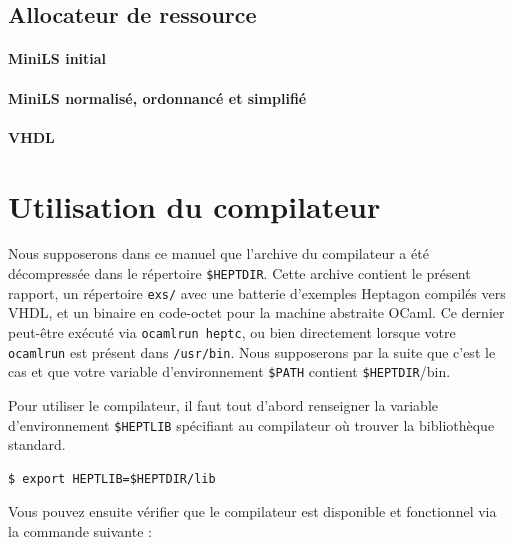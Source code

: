 \documentclass[a4paper]{article}
\newcommand{\LANG}{Heptagon}
\begin{document}
\subsection{Allocateur de ressource}

\paragraph{MiniLS initial}

\small

\normalsize

\paragraph{MiniLS normalis\'e, ordonnanc\'e et simplifi\'e}

\small

\normalsize

\paragraph{VHDL}

\small

\normalsize

\section{Utilisation du compilateur}

Nous supposerons dans ce manuel que l'archive du compilateur a \'et\'e
d\'ecompress\'ee dans le r\'epertoire \verb/$HEPTDIR/. Cette archive contient le
pr\'esent rapport, un r\'epertoire \texttt{exs/} avec une batterie d'exemples
\LANG{} compil\'es vers VHDL, et un binaire en code-octet pour la machine
abstraite OCaml. Ce dernier peut-\^etre ex\'ecut\'e via \texttt{ocamlrun heptc},
ou bien directement lorsque votre \texttt{ocamlrun} est pr\'esent dans
\texttt{/usr/bin}. Nous supposerons par la suite que c'est le cas et que votre
variable d'environnement \verb/$PATH/ contient \verb/$HEPTDIR//bin.

Pour utiliser le compilateur, il faut tout d'abord renseigner la variable
d'environnement \verb/$HEPTLIB/ sp\'ecifiant au compilateur o\`u trouver la
biblioth\`eque standard.

\begin{verbatim}
$ export HEPTLIB=$HEPTDIR/lib
\end{verbatim}

Vous pouvez ensuite v\'erifier que le compilateur est disponible et fonctionnel
via la commande suivante :
\end{document}
